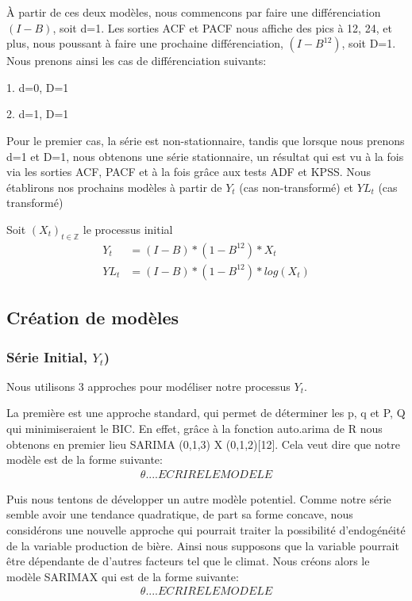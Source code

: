 \documentclass[12pt,a4paper]{book}
\newcommand{\1}{\mathds{1}}
\begin{document}
\vspace{5 mm}
À partir de ces deux modèles, nous commencons par faire une différenciation $(I-B)$, soit d=1. Les sorties ACF et PACF nous affiche des pics à 12, 24, et plus, nous poussant à faire une prochaine différenciation, $(I-B^{12})$, soit D=1. Nous prenons ainsi les cas de différenciation suivants:
\begin{description}
  \item 1. d=0, D=1
  \item 2. d=1, D=1
\end{description}
\noindent 
Pour le premier cas, la série est non-stationnaire, tandis que lorsque nous prenons d=1 et D=1, nous obtenons une série stationnaire, un résultat qui est vu à la fois via les sorties ACF, PACF et à la fois grâce aux tests ADF et KPSS. Nous établirons nos prochains modèles à partir de $Y_t$ (cas non-transformé) et $YL_t$ (cas transformé)

\noindent 
Soit $(X_t)_{t\in \mathbb{Z}}$ le processus initial
\begin{align*}
Y_t &= (I-B) * (1-B^{12}) * X_t \\ 
YL_t &= (I-B) * (1-B^{12}) * log(X_t)
\end{align*}



\vspace{5 mm}
\subsection{Création de modèles}

\vspace{5 mm}
\subsubsection{Série Initial, $Y_t$)}

Nous utilisons 3 approches pour modéliser notre processus $Y_t$.

La première est une approche standard, qui permet de déterminer les p, q et P, Q qui minimiseraient le BIC. En effet, grâce à la fonction auto.arima de R nous obtenons en premier lieu SARIMA (0,1,3) X (0,1,2)[12]. Cela veut dire que notre modèle est de la forme suivante:
\begin{align*}
\theta ....ECRIRE LE MODELE
\end{align*}

Puis nous tentons de développer un autre modèle potentiel. Comme notre série semble avoir une tendance quadratique, de part sa forme concave, nous considérons une nouvelle approche qui pourrait traiter la possibilité d'endogénéité de la variable production de bière. Ainsi nous supposons que la variable pourrait être dépendante de d'autres facteurs tel que le climat. Nous créons alors le modèle SARIMAX qui est de la forme suivante:
\begin{align*}
\theta ....ECRIRE LE MODELE
\end{align*}
\end{document}
